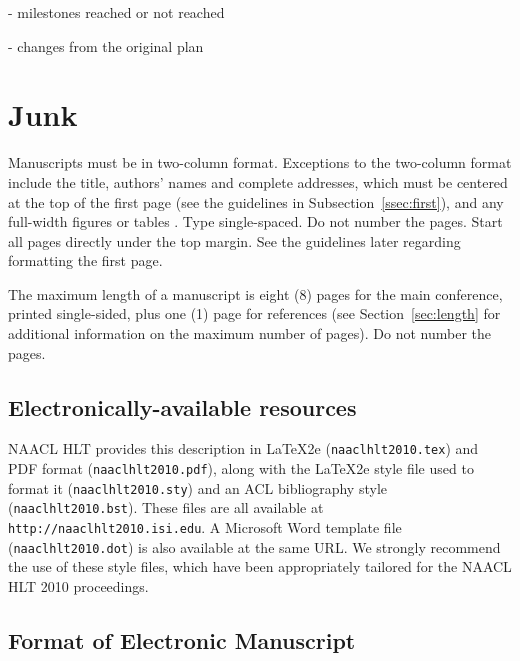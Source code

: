 \documentclass[11pt,letterpaper]{article}
\begin{document}
- milestones reached or not reached

- changes from the original plan


\section{Junk}
Manuscripts must be in two-column format.  Exceptions to the
two-column format include the title, authors' names and complete
addresses, which must be centered at the top of the first page (see
the guidelines in Subsection~\ref{ssec:first}), and any full-width
figures or tables .  Type single-spaced.  Do not number the pages.
Start all pages directly under the top margin.  See the guidelines
later regarding formatting the first page.

The maximum length of a manuscript is eight (8) pages for the main
conference, printed single-sided, plus one (1) page for references
(see Section~\ref{sec:length} for additional information on the
maximum number of pages).  Do not number the pages.

\subsection{Electronically-available resources}

NAACL HLT provides this description in \LaTeX2e{} ({\tt naaclhlt2010.tex}) and PDF
format ({\tt naaclhlt2010.pdf}), along with the \LaTeX2e{} style file used to
format it ({\tt naaclhlt2010.sty}) and an ACL bibliography style ({\tt naaclhlt2010.bst}).
These files are all available at
{\tt http://naaclhlt2010.isi.edu}.  A Microsoft Word
template file ({\tt naaclhlt2010.dot}) is also available at the same URL. We
strongly recommend the use of these style files, which have been
appropriately tailored for the NAACL HLT 2010 proceedings.


\subsection{Format of Electronic Manuscript}
\label{sect:pdf}
\end{document}
